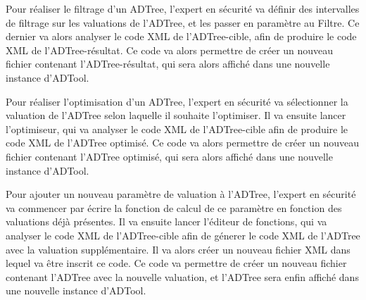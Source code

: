 %

Pour réaliser le filtrage d'un ADTree, l'expert en sécurité va définir des intervalles de filtrage sur les valuations de l'ADTree, et les passer en paramètre au Filtre. Ce dernier va alors analyser le code XML de l'ADTree-cible, afin de produire le code XML de l'ADTree-résultat. Ce code va alors permettre de créer un nouveau fichier contenant l'ADTree-résultat, qui sera alors affiché dans une nouvelle instance d'ADTool.

%

Pour réaliser l'optimisation d'un ADTree, l'expert en sécurité va sélectionner la valuation de l'ADTree selon laquelle il souhaite l'optimiser. Il va ensuite lancer l'optimiseur, qui va analyser le code XML de l'ADTree-cible afin de produire le code XML de l'ADTree optimisé. Ce code va alors permettre de créer un nouveau fichier contenant l'ADTree optimisé, qui sera alors affiché dans une nouvelle instance d'ADTool.

%

Pour ajouter un nouveau paramètre de valuation à l'ADTree, l'expert en sécurité va commencer par écrire la fonction de calcul de ce paramètre en fonction des valuations déjà présentes. Il va ensuite lancer l'éditeur de fonctions, qui va analyser le code XML de l'ADTree-cible afin de génerer le code XML de l'ADTree avec la valuation supplémentaire. Il va alors créer un nouveau fichier XML dans lequel va être inscrit ce code. Ce code va permettre de créer un nouveau fichier contenant l'ADTree avec la nouvelle valuation, et l'ADTree sera enfin affiché dans une nouvelle instance d'ADTool.